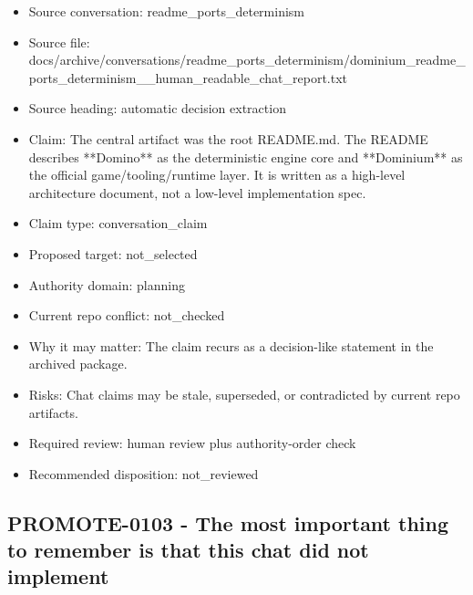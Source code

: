 \documentclass[11pt,a4paper]{report}
\begin{document}
\begin{itemize}
\item Source conversation: readme\_ports\_determinism
\item Source file: docs/archive/conversations/readme\_ports\_determinism/dominium\_readme\_ports\_determinism\_\_human\_readable\_chat\_report.txt
\item Source heading: automatic decision extraction
\item Claim: The central artifact was the root README.md. The README describes **Domino** as the deterministic engine core and **Dominium** as the official game/tooling/runtime layer. It is written as a high-level architecture document, not a low-level implementation spec.
\item Claim type: conversation\_claim
\item Proposed target: not\_selected
\item Authority domain: planning
\item Current repo conflict: not\_checked
\item Why it may matter: The claim recurs as a decision-like statement in the archived package.
\item Risks: Chat claims may be stale, superseded, or contradicted by current repo artifacts.
\item Required review: human review plus authority-order check
\item Recommended disposition: not\_reviewed
\end{itemize}

\subsection{PROMOTE-0103 - The most important thing to remember is that this chat did not implement}
\end{document}
